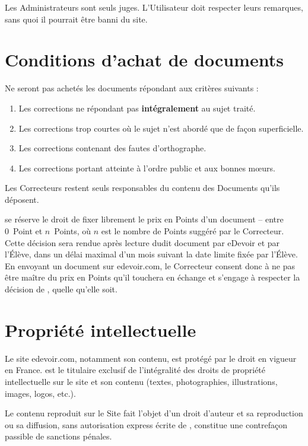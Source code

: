 Les Administrateurs sont seuls juges. L'Utilisateur doit respecter leurs remarques, sans quoi il pourrait être banni du site.


\section{Conditions d'achat de documents}

Ne seront pas achetés les documents répondant aux critères suivants :
\begin{enumerate}
   \item Les corrections ne répondant pas \textbf{intégralement} au sujet traité.
   \item Les corrections trop courtes où le sujet n'est abordé que de façon superficielle.
   \item Les corrections contenant des fautes d'orthographe.
   \item Les corrections portant atteinte à l'ordre public et aux bonnes m\oe{}urs.
\end{enumerate}

Les Correcteurs restent seuls responsables du contenu des Documents qu'ils déposent.

\eDevoir se réserve le droit de fixer librement le prix en Points d'un document -- entre 0~Point et $n$~Points, où $n$ est le nombre de Points suggéré par le Correcteur. Cette décision sera rendue après lecture dudit document par eDevoir et par l'Élève, dans un délai maximal d'un mois suivant la date limite fixée par l'Élève. En envoyant un document sur edevoir.com, le Correcteur consent donc à ne pas être maître du prix en Points qu'il touchera en échange et s'engage à respecter la décision de \eDevoir, quelle qu'elle soit.


\section{Propriété intellectuelle}

Le site edevoir.com, notamment son contenu, est protégé par le droit en vigueur en France. \eDevoir est le titulaire exclusif de l'intégralité des droits de propriété intellectuelle sur le site et son contenu (textes, photographies, illustrations, images, logos, etc.).

Le contenu reproduit sur le Site fait l'objet d'un droit d'auteur et sa reproduction ou sa diffusion, sans autorisation express écrite de \eDevoir, constitue une contrefaçon passible de sanctions pénales.

